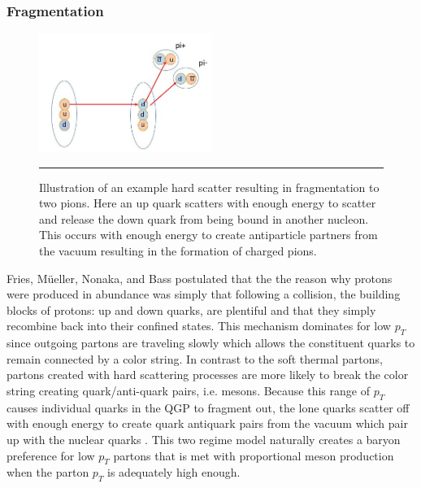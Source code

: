 \subsubsection{Fragmentation}
\begin{figure}[htbp!]
  \centering
    \includegraphics[width=0.5\textwidth]{Figures/fragmentationdiag.JPG}
    \rule{35em}{0.5pt}
  \caption[Illustration of an example hard scatter resulting in fragmentation to two pions]{Illustration of an example hard scatter resulting in fragmentation to two pions. Here an up quark scatters with enough energy to scatter and release the down quark from being bound in another nucleon. This occurs with enough energy to create antiparticle partners from the vacuum resulting in the formation of charged pions.}
  \label{fig:fragmentationdiag}
\end{figure} 
Fries, M{\"u}eller, Nonaka, and Bass postulated that the the reason why protons were produced in abundance was simply that following a collision, the building blocks of protons: up and down quarks, are plentiful and that they simply recombine back into their confined states. This mechanism dominates for low $p_{T}$ since outgoing partons are traveling slowly which allows the constituent quarks to remain connected by a color string. In contrast to the soft thermal partons, partons created with hard scattering processes are more likely to break the color string creating quark/anti-quark pairs, i.e. mesons. Because this range of $p_{T}$ causes individual quarks in the QGP to fragment out, the lone quarks scatter off with enough energy to create quark antiquark pairs from the vacuum which pair up with the nuclear quarks . This two regime model naturally creates a baryon preference for low $p_{T}$ partons that is met with proportional meson production when the parton $p_{T}$ is adequately high enough.

